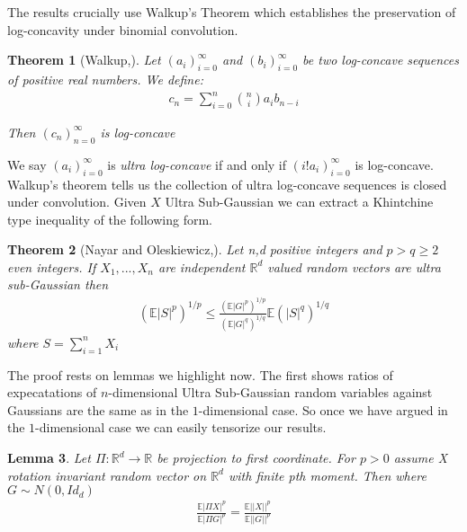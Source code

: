 \documentclass[10pt]{article}
\newcommand{\E}{\mathbb{E}}
\newcommand{\1}{\textbf{1}}
\newcommand{\R}{\mathbb{R}}
\newcommand{\normOne}[1]{\left\lvert#1\right\rvert}
\newtheorem{theorem}{Theorem}[subsection]
\newtheorem{lemma}[theorem]{Lemma}
\theoremstyle{remark}
\theoremstyle{definition}
\begin{document}
The results crucially use Walkup's Theorem which establishes the preservation of log-concavity under binomial convolution.

\begin{theorem}[Walkup,\cite{WW}]\label{thm:Walkup}
	Let $(a_i)_{i=0}^{\infty}$ and $(b_i)_{i=0}^{\infty}$ be two log-concave sequences of positive real numbers. We define:
	\begin{align*}
		c_n = \sum_{i=0}^n {n \choose i} a_i b_{n-i}
	\end{align*}

	Then $(c_n)_{n=0}^{\infty}$ is log-concave
\end{theorem}


We say $(a_i)_{i=0}^{\infty}$ is \textit{ultra log-concave} if and only if $(i! a_i)_{i=0}^{\infty}$ is log-concave. Walkup's theorem tells us the collection of ultra log-concave sequences is closed under convolution. Given $X$ Ultra Sub-Gaussian we can extract a Khintchine type inequality of the following form.

\begin{theorem}[Nayar and Oleskiewicz,\cite{NO}]\label{thm:USG1}
	Let n,d positive integers and $p > q \geq 2$ even integers. If $X_1,...,X_n$ are independent $\R^d$ valued random vectors are ultra sub-Gaussian then
	\begin{align*}
		(\E \normOne{S}^p)^{1/p} \leq \frac{(\E\normOne{G}^p)^{1/p}}{(\E\normOne{G}^q)^{1/q}}\E (\normOne{S}^q)^{1/q}
	\end{align*} where $S = \sum_{i=1}^n X_i$
\end{theorem} 

The proof rests on lemmas we highlight now. The first shows ratios of expecatations of $n$-dimensional Ultra Sub-Gaussian random variables against Gaussians are the same as in the $1$-dimensional case. So once we have argued in the $1$-dimensional case we can easily tensorize our results.

\begin{lemma}\label{lem:USG1}
	Let $\Pi: \R^d \to \R$ be projection to first coordinate. For $p > 0$ assume X rotation invariant random vector on $\R^d$ with finite pth moment. Then where $G \sim N(0,Id_d)$
	\begin{align*}
		\frac{\E|\Pi X|^p}{\E |\Pi G|^p} = \frac{\E||X||^p}{\E||G||^p}
	\end{align*}
\end{lemma}
\end{document}
